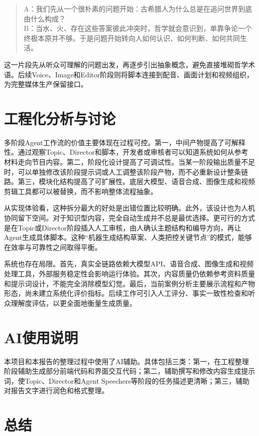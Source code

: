 \documentclass{rjthesis}
\begin{document}
\begin{quote}
A：我们先从一个很朴素的问题开始：古希腊人为什么总是在追问世界到底由什么构成？\\
B：当水、火、存在这些答案彼此冲突时，哲学就会意识到，单靠争论一个终极本原并不够。于是问题开始转向人如何认识、如何判断、如何共同生活。
\end{quote}

这一片段先从听众可理解的问题出发，再逐步引出抽象概念，避免直接堆砌哲学术语。后续Voice、Image和Editor阶段则将脚本连接到配音、画面计划和视频组织，为完整媒体生产保留接口。

\section{工程化分析与讨论}

多阶段Agent工作流的价值主要体现在过程可控。第一，中间产物提高了可解释性。通过观察Topic、Director和脚本，开发者或审核者可以知道系统如何从参考材料走向节目内容。第二，阶段化设计提高了可调试性。当某一阶段输出质量不足时，可以单独修改该阶段提示词或人工调整该阶段产物，而不必重新设计整条链路。第三，模块化结构提高了可扩展性。底层大模型、语音合成、图像生成和视频剪辑工具都可以被替换，而不影响整体流程抽象。

从实现体验看，这种拆分最大的好处是出错位置比较明确。此外，该设计也为人机协同留下空间。对于知识型内容，完全自动生成并不总是最优选择。更可行的方式是在Topic或Director阶段插入人工审核，由人确认主题结构和编导方向，再让Agent生成具体脚本。这种“机器生成结构草案、人类把控关键节点”的模式，能够在效率与可靠性之间取得平衡。

系统也存在局限。首先，真实全链路依赖大模型API、语音合成、图像生成和视频处理工具，外部服务稳定性会影响运行体验。其次，内容质量仍依赖参考资料质量和提示词设计，不能完全消除模型幻觉。最后，当前案例分析主要展示流程和产物形态，尚未建立系统化评价指标。后续工作可引入人工评分、事实一致性检查和听众理解度评估，以更全面地衡量生成质量。

\section{AI使用说明}

本项目和本报告的整理过程中使用了AI辅助。具体包括三类：第一，在工程整理阶段辅助生成部分前端代码和界面交互代码；第二，辅助撰写和修改内容生成提示词，使Topic、Director和Agent Speechers等阶段的任务描述更清晰；第三，辅助对报告文字进行润色和格式整理。

\section{总结}
\end{document}
